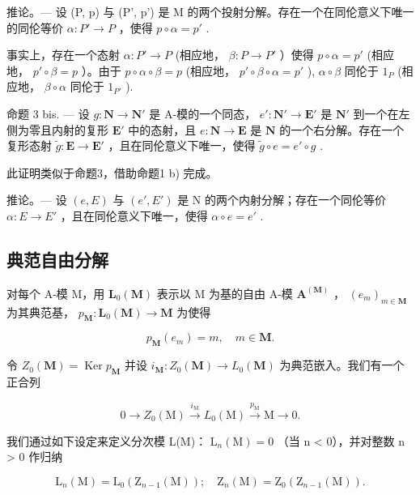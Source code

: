 推论。--- 设 (P, p) 与 (P', p') 是 M 的两个投射分解。存在一个在同伦意义下唯一的同伦等价 \(\alpha: P' \to P\) ，使得 \(p \circ \alpha = p'\) .

事实上，存在一个态射 \(\alpha: P' \to P\) (相应地， \(\beta: P \to P'\) ）使得 \(p \circ \alpha = p'\) (相应地， \(p' \circ \beta = p\) ）。由于 \(p \circ \alpha \circ \beta = p\) (相应地， \(p' \circ \beta \circ \alpha = p'\) ), \(\alpha \circ \beta\) 同伦于 \(1_P\) (相应地， \(\beta \circ \alpha\) 同伦于 \(1_{P'}\) ).

命题 3 bis. --- 设 \(g: \mathbf{N} \to \mathbf{N}'\) 是 A-模的一个同态， \(e': \mathbf{N}' \to \mathbf{E}'\) 是 \(\mathbf{N}'\) 到一个在左侧为零且内射的复形 \(\mathbf{E}'\) 中的态射，且 \(e: \mathbf{N} \to \mathbf{E}\) 是 \(\mathbf{N}\) 的一个右分解。存在一个复形态射 \(\tilde{g}: \mathbf{E} \to \mathbf{E}'\) ，且在同伦意义下唯一，使得 \(\tilde{g} \circ e = e' \circ g\) .

此证明类似于命题3，借助命题1 b) 完成。

推论。--- 设 \((e, E)\) 与 \((e', E')\) 是 N 的两个内射分解；存在一个同伦等价 \(\alpha : E \to E'\) ，且在同伦意义下唯一，使得 \(\alpha \circ e = e'\) .

\subsection{典范自由分解}

对每个 A-模 M，用 \(\mathbf{L}_{0}(\mathbf{M})\) 表示以 M 为基的自由 A-模 \(\mathbf{A}^{(\mathbf{M})}\) ， \((e_{m})_{m\in\mathbf{M}}\) 为其典范基， \(p_{\mathbf{M}}:\mathbf{L}_{0}(\mathbf{M})\to\mathbf{M}\) 为使得

\[
p _ {\mathbf {M}} (e _ {m}) = m, \quad m \in \mathbf {M}.
\]

令 \(Z_0(\mathbf{M}) = \operatorname{Ker} p_{\mathbf{M}}\) 并设 \(i_{\mathbf{M}}: Z_0(\mathbf{M}) \to L_0(\mathbf{M})\) 为典范嵌入。我们有一个正合列

\[
0 \longrightarrow Z _ {0} (\mathrm{M}) \stackrel {i _ {\mathrm{M}}} {\longrightarrow} L _ {0} (\mathrm{M}) \stackrel {p _ {\mathrm{M}}} {\longrightarrow} \mathrm{M} \longrightarrow 0.\tag{1}
\]

我们通过如下设定来定义分次模 L(M)： \(\mathrm{L}_{n}(\mathrm{M}) = 0\) （当 n \textless{} 0），并对整数 n \textgreater{} 0 作归纳

\[
\mathrm{L} _ {n} (\mathrm{M}) = \mathrm{L} _ {0} \left(\mathrm{Z} _ {n - 1} (\mathrm{M})\right); \quad \mathrm{Z} _ {n} (\mathrm{M}) = \mathrm{Z} _ {0} \left(\mathrm{Z} _ {n - 1} (\mathrm{M})\right).\tag{2}
\]

